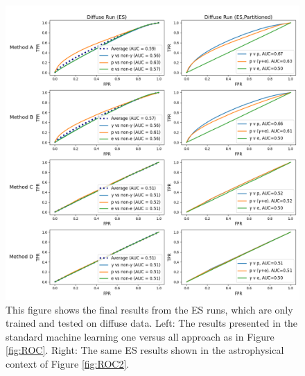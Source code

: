 \begin{figure}
  \centering
  \includegraphics[width=\textwidth]{figures/esplot.png}
  \caption{This figure shows the final results from the ES runs, which are only trained and tested on diffuse data. Left: The results presented in the standard machine learning one versus all approach as in Figure \ref{fig:ROC}. Right: The same ES results shown in the astrophysical context of Figure \ref{fig:ROC2}.
  }
  \label{fig:ROC3}
\end{figure}

